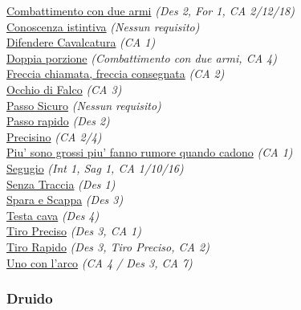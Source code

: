 \begin{multicols}{3}
{\begin{flushleft}
\hyperlink{Combattimento con due armi}{Combattimento con due armi} \textit{(Des 2, For 1, CA 2/12/18)}\\
\hyperlink{Conoscenza istintiva}{Conoscenza istintiva} \textit{(Nessun requisito)}\\
\hyperlink{Difendere Cavalcatura}{Difendere Cavalcatura} \textit{(CA 1)}\\
\hyperlink{Doppia porzione}{Doppia porzione} \textit{(Combattimento con due armi, CA 4)}\\
\hyperlink{Freccia chiamata, freccia consegnata}{Freccia chiamata, freccia consegnata} \textit{(CA 2)}\\
\hyperlink{Occhio di Falco}{Occhio di Falco} \textit{(CA 3)}\\
\hyperlink{Passo Sicuro}{Passo Sicuro} \textit{(Nessun requisito)}\\
\hyperlink{Passo rapido}{Passo rapido} \textit{(Des 2)}\\
\hyperlink{Precisino}{Precisino} \textit{(CA 2/4)}\\
\hyperlink{Piu' sono grossi piu' fanno rumore quando cadono}{Piu' sono grossi piu' fanno rumore quando cadono} \textit{(CA 1)}\\
\hyperlink{Segugio}{Segugio} \textit{(Int 1, Sag 1, CA 1/10/16)}\\
\hyperlink{Senza Traccia}{Senza Traccia} \textit{(Des 1)}\\
\hyperlink{Spara e Scappa}{Spara e Scappa} \textit{(Des 3)}\\
\hyperlink{Testa cava}{Testa cava} \textit{(Des 4)}\\
\hyperlink{Tiro Preciso}{Tiro Preciso} \textit{(Des 3, CA 1)}\\
\hyperlink{Tiro Rapido}{Tiro Rapido} \textit{(Des 3, Tiro Preciso, CA 2)}\\
\hyperlink{Uno con l'arco}{Uno con l'arco} \textit{(CA 4 / Des 3, CA 7)}\\

\titlespacing*{\subsubsection}{0pt}{0.5em}{0.5em}\subsubsection*{Druido}


\end{flushleft}}
\end{multicols}
